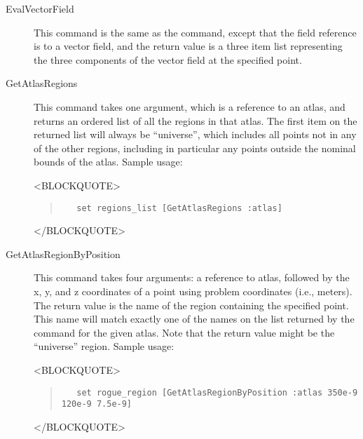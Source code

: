 \begin{description}
\item[EvalVectorField\label{html:mif2EvalVectorField}]
This command is the same as the  command, except
that the field reference is to a vector field, and the return value is a
three item list representing the three components of the vector field at
the specified point.

\item[GetAtlasRegions\label{html:mif2GetAtlasRegions}]
This command takes one argument, which is a reference to an atlas, and
returns an ordered list of all the regions in that atlas.  The first
item on the returned list will always be ``universe'', which includes
all points not in any of the other regions, including in particular any
points outside the nominal bounds of the atlas.  Sample usage:
\begin{rawhtml}<BLOCKQUOTE>\end{rawhtml}
\begin{quote}
\begin{verbatim}
   set regions_list [GetAtlasRegions :atlas]
\end{verbatim}
\end{quote}
\begin{rawhtml}</BLOCKQUOTE>\end{rawhtml}


\item[GetAtlasRegionByPosition\label{html:mif2GetAtlasRegionByPosition}]
This command takes four arguments: a reference to atlas, followed by the
x, y, and z coordinates of a point using problem coordinates (i.e.,
meters).  The return value is the name of the region containing the
specified point.  This name will match exactly one of the names on the
list returned by the  command for the given atlas.
Note that the return value might be the ``universe'' region.  Sample
usage:
\begin{rawhtml}<BLOCKQUOTE>\end{rawhtml}
\begin{quote}
\begin{verbatim}
   set rogue_region [GetAtlasRegionByPosition :atlas 350e-9 120e-9 7.5e-9]
\end{verbatim}
\end{quote}
\begin{rawhtml}</BLOCKQUOTE>\end{rawhtml}


\end{description}

